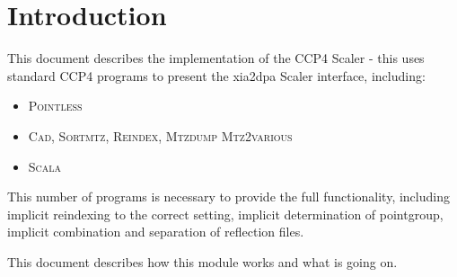 \documentclass[a4paper, 11pt]{article}
\begin{document}
\section{Introduction}

This document describes the implementation of the CCP4 Scaler - this uses 
standard CCP4 programs to present the xia2dpa Scaler interface, including:

\begin{itemize}
\item{\textsc{Pointless}}
\item{\textsc{Cad}, \textsc{Sortmtz}, \textsc{Reindex}, \textsc{Mtzdump}
\textsc{Mtz2various}}
\item{\textsc{Scala}}
\end{itemize}

\noindent
This number of programs is necessary to provide the full functionality,
including implicit reindexing to the correct setting, implicit determination
of pointgroup, implicit combination and separation of reflection files.

This document describes how this module works and what is going on.
\end{document}
